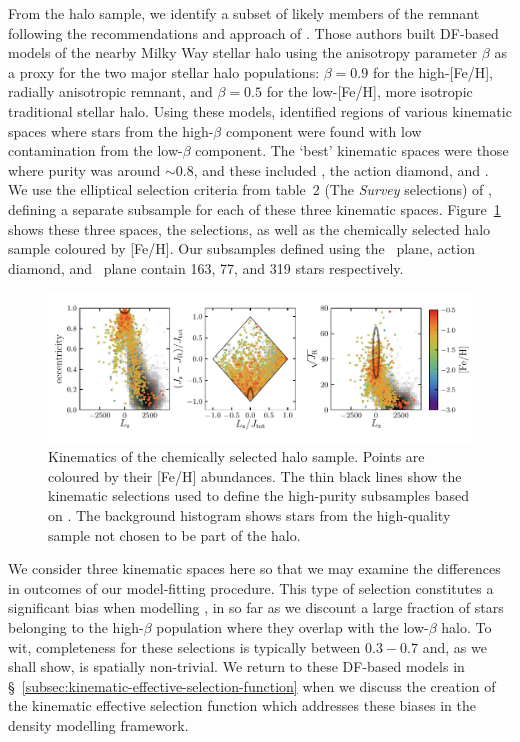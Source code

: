 From the halo sample, we identify a subset of likely members of the \gse remnant following the recommendations and approach of \cite{lane22}. Those authors built DF-based models of the nearby Milky Way stellar halo using the anisotropy parameter $\beta$ as a proxy for the two major stellar halo populations: $\beta=0.9$ for the high-[Fe/H], radially anisotropic \gse remnant, and $\beta=0.5$ for the low-[Fe/H], more isotropic traditional stellar halo. Using these models, \cite{lane22} identified regions of various kinematic spaces where stars from the high-$\beta$ component were found with low contamination from the low-$\beta$ component. The `best' kinematic spaces were those where purity was around $\sim 0.8$, and these included \eLz, the action diamond, and \JRLz. We use the elliptical selection criteria from table~2 (The \textit{Survey} selections) of \cite{lane22}, defining a separate \gse subsample for each of these three kinematic spaces. Figure~\ref{fig:halo_kinematics} shows these three spaces, the \gse selections, as well as the chemically selected halo sample coloured by [Fe/H]. Our \gse subsamples defined using the \eLz\ plane, action diamond, and \JRLz\ plane contain 163, 77, and 319 stars respectively.

\begin{figure}
    \centering
    \includegraphics[width=\linewidth]{figure/ch3/halo_kinematics.pdf}
    \caption{Kinematics of the chemically selected halo sample. Points are coloured by their [Fe/H] abundances. The thin black lines show the kinematic selections used to define the high-purity \gse subsamples based on \cite{lane22}. The background histogram shows stars from the high-quality sample not chosen to be part of the halo.}
    \label{fig:halo_kinematics}
\end{figure}

We consider three kinematic spaces here so that we may examine the differences in outcomes of our model-fitting procedure. This type of selection constitutes a significant bias when modelling \gse, in so far as we discount a large fraction of stars belonging to the high-$\beta$ \gse population where they overlap with the low-$\beta$ halo. To wit, completeness for these selections is typically between $0.3-0.7$ and, as we shall show, is spatially non-trivial. We return to these DF-based models in \S~\ref{subsec:kinematic-effective-selection-function} when we discuss the creation of the kinematic effective selection function which addresses these biases in the density modelling framework.

